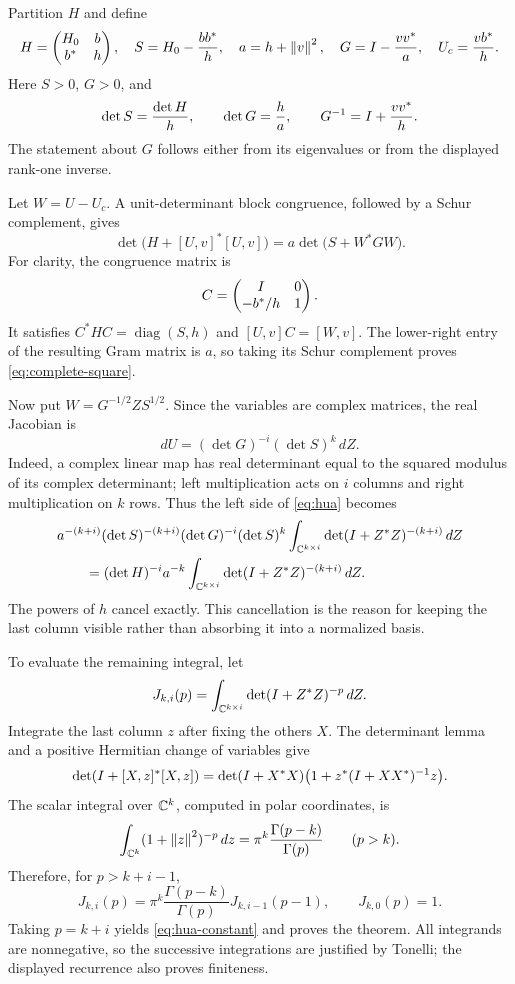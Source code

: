 Partition \(H\) and define
\begin{equation}\label{eq:schur-data}
 H=\begin{pmatrix}H_0&b\\b^*&h\end{pmatrix},\quad
 S=H_0-\frac{bb^*}{h},\quad
 a=h+\left\lVert v\right\rVert^2,\quad
 G=I-\frac{vv^*}{a},\quad
 U_c=\frac{vb^*}{h}.
\end{equation}
Here \(S>0\), \(G>0\), and
\begin{equation}\label{eq:schur-dets}
 \det S=\frac{\det H}{h},\qquad
 \det G=\frac{h}{a},\qquad
 G^{-1}=I+\frac{vv^*}{h}.
\end{equation}
The statement about \(G\) follows either from its eigenvalues or from the displayed
rank-one inverse.

Let \(W=U-U_c\). A unit-determinant block congruence, followed by a Schur complement,
gives
\begin{equation}\label{eq:complete-square}
 \det\bigl(H+[U,v]^*[U,v]\bigr)
       =a\det\bigl(S+W^*GW\bigr).
\end{equation}
For clarity, the congruence matrix is
\[
 C=\begin{pmatrix}I&0\\-b^*/h&1\end{pmatrix}.
\]
It satisfies \(C^*HC=\operatorname{diag}(S,h)\) and
\([U,v]C=[W,v]\). The lower-right entry of the resulting Gram matrix is
\(a\), so taking its Schur complement proves \eqref{eq:complete-square}.

Now put \(W=G^{-1/2}ZS^{1/2}\). Since the variables are complex matrices,
the real Jacobian is
\[
 dU=(\det G)^{-i}(\det S)^k\,dZ.
\]
Indeed, a complex linear map has real determinant equal to the squared modulus
of its complex determinant; left multiplication acts on \(i\) columns and
right multiplication on \(k\) rows.
Thus the left side of \eqref{eq:hua} becomes
\begin{align*}
 &a^{-(k+i)}(\det S)^{-(k+i)}
    (\det G)^{-i}(\det S)^k
    \int_{\mathbb C^{k\times i}}\det(I+Z^*Z)^{-(k+i)}\,dZ\\
 &\qquad=(\det H)^{-i}a^{-k}
    \int_{\mathbb C^{k\times i}}\det(I+Z^*Z)^{-(k+i)}\,dZ.
\end{align*}
The powers of \(h\) cancel exactly. This cancellation is the reason for keeping the
last column visible rather than absorbing it into a normalized basis.

To evaluate the remaining integral, let
\[
 J_{k,i}(p)=\int_{\mathbb C^{k\times i}}\det(I+Z^*Z)^{-p}\,dZ.
\]
Integrate the last column \(z\) after fixing the others \(X\). The determinant lemma
and a positive Hermitian change of variables give
\[
 \det(I+[X,z]^*[X,z])
 =\det(I+X^*X)
       \bigl(1+z^*(I+XX^*)^{-1}z\bigr).
\]
The scalar integral over \(\mathbb C^k\), computed in polar coordinates, is
\[
 \int_{\mathbb C^k}(1+\left\lVert z\right\rVert^2)^{-p}\,dz
       =\pi^k\frac{\Gamma(p-k)}{\Gamma(p)}
       \qquad(p>k).
\]
Therefore, for \(p>k+i-1\),
\[
 J_{k,i}(p)=\pi^k\frac{\Gamma(p-k)}{\Gamma(p)}
              J_{k,i-1}(p-1),\qquad J_{k,0}(p)=1.
\]
Taking \(p=k+i\) yields \eqref{eq:hua-constant} and proves the theorem.
All integrands are nonnegative, so the successive integrations are justified
by Tonelli; the displayed recurrence also proves finiteness.

